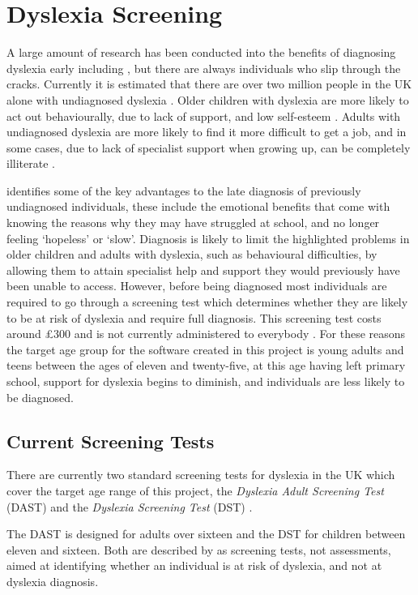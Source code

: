 \documentclass[journal]{IEEEtran}
\begin{document}
\section{Dyslexia Screening}
\label{sec:screening}
A large amount of research has been conducted into the benefits of diagnosing dyslexia early including \cite{earlyIntervention, early_computerised}, but there are always individuals who slip through the cracks. Currently it is estimated that there are over two million people in the UK alone with undiagnosed dyslexia \cite{twomillion}. Older children with dyslexia are more likely to act out behaviourally, due to lack of support, and low self-esteem \cite{behaviour}. Adults with undiagnosed dyslexia are more likely to find it more difficult to get a job, and in some cases, due to lack of specialist support when growing up, can be completely illiterate \cite{bda}. 

\cite{managing_at_uni} identifies some of the key advantages to the late diagnosis of previously undiagnosed individuals, these include the emotional benefits that come with knowing the reasons why they may have struggled at school, and no longer feeling `hopeless' or `slow'. Diagnosis is likely to limit the highlighted problems in older children and adults with dyslexia, such as behavioural difficulties, by allowing them to attain specialist help and support they would previously have been unable to access. However, before being diagnosed most individuals are required to go through a screening test which determines whether they are likely to be at risk of dyslexia and require full diagnosis. This screening test costs around \pounds 300
and is not currently administered to everybody \cite{bda}. For these reasons the target age group for the software created in this project is young adults and teens between the ages of eleven and twenty-five, at this age having left primary school, support for dyslexia begins to diminish, and individuals are less likely to be diagnosed\cite{DetectAndManage}.

\subsection{Current Screening Tests}
\label{sec:currentscreeningtests}
There are currently two standard screening tests for dyslexia in the UK which cover the target age range of this project, the \textit{Dyslexia Adult Screening Test} (DAST) and the \textit{Dyslexia  Screening Test} (DST) \cite{bda, dast}. 

The DAST is designed for adults over sixteen and the DST for children between eleven and sixteen. Both are described by \cite{dast} as screening tests, not assessments, aimed at identifying whether an individual is at risk of dyslexia, and not at dyslexia diagnosis. 
\end{document}
